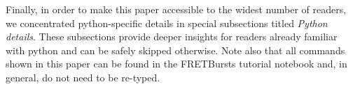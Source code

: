 Finally, in order to make this paper accessible to the widest number of readers,
we concentrated python-specific details in special subsections titled
\textit{Python details}. These subsections provide deeper insights for readers
already familiar with python and can be safely skipped otherwise. Note also
that all commands shown in this paper can be found in the FRETBursts tutorial notebook
and, in general, do not need to be re-typed.

